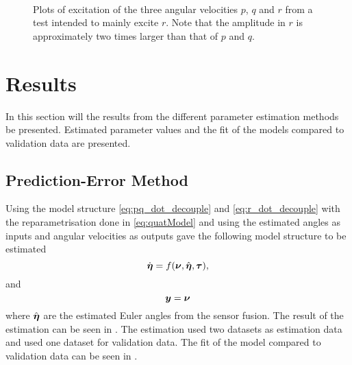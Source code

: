 \begin{figure}[htbp]
  \centering
  \qquad
  \\
  \caption{\label{fig:rTest}%
 Plots of excitation of the three angular velocities $p$, $q$ and $r$ from a test intended to mainly excite $r$. Note that the amplitude in $r$ is approximately two times larger than that of $p$ and $q$.}
\end{figure}

\section{Results}
In this section will the results from the different parameter estimation methods be presented. Estimated parameter values and the fit of the models compared to validation data are presented.

\subsection{Prediction-Error Method}
Using the model structure \eqref{eq:pq_dot_decouple} and \eqref{eq:r_dot_decouple} with the reparametrisation done in \eqref{eq:quatModel} and using the estimated angles as inputs and angular velocities as outputs gave the following model structure to be estimated
\begin{equation}
\dot{\boldsymbol{\eta}} = f(\boldsymbol{\nu}, \hat{\boldsymbol{\eta}}, \boldsymbol{\tau}),
\end{equation}
and
\begin{equation}
\boldsymbol{y} = \boldsymbol{\nu}
\end{equation}
where $\hat{\boldsymbol{\eta}}$ are the estimated Euler angles from the sensor fusion.
The result of the estimation can be seen in . The estimation used two datasets as estimation data and used one dataset for validation data. The fit of the model compared to validation data can be seen in .

